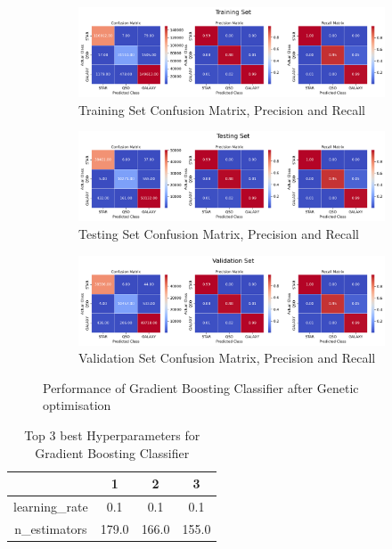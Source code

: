 \begin{figure}[H]
    \centering
    \begin{subfigure}{\textwidth}
        \includegraphics[width=\linewidth]{images/GA_GBC_Train.png}
        \caption{Training Set Confusion Matrix, Precision and Recall}
        \label{fig:GAGBCTrain}
    \end{subfigure}
    \begin{subfigure}{\textwidth}
        \includegraphics[width=\linewidth]{images/GA_GBC_Test.png}
        \caption{Testing Set Confusion Matrix, Precision and Recall}
        \label{fig:GAGBCTest}
    \end{subfigure}
    \begin{subfigure}{\textwidth}
        \includegraphics[width=\linewidth]{images/GA_GBC_Val.png}
        \caption{Validation Set Confusion Matrix, Precision and Recall}
        \label{fig:GAGBCVal}
    \end{subfigure}
    \caption{Performance of Gradient Boosting Classifier after Genetic optimisation}
    \label{fig:GAGBC}
\end{figure}

\begin{table}[H]
\centering
\caption{Top 3 best Hyperparameters for Gradient Boosting Classifier}
\begin{tabular}{|c|c|c|c|}
\hline
& 1 & 2 & 3 \\
\hline
learning\_rate & 0.1 & 0.1 & 0.1 \\
n\_estimators & 179.0 & 166.0 & 155.0 \\
\hline
\end{tabular}
\end{table}

